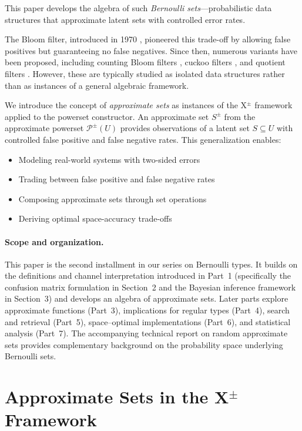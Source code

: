 \documentclass[11pt,final,hidelinks]{article}
\begin{document}
This paper develops the algebra of such \emph{Bernoulli sets}—probabilistic data structures that approximate latent sets with controlled error rates.

The Bloom filter, introduced in 1970 \cite{bloom1970}, pioneered this trade-off by allowing false positives but guaranteeing no false negatives. Since then, numerous variants have been proposed, including counting Bloom filters \cite{fan2000}, cuckoo filters \cite{fan2014}, and quotient filters \cite{bender2012}. However, these are typically studied as isolated data structures rather than as instances of a general algebraic framework.

We introduce the concept of \emph{approximate sets} as instances of the X$^{\pm}$ framework applied to the powerset constructor. An approximate set $S^{\pm}$ from the approximate powerset $\mathcal{P}^{\pm}(U)$ provides observations of a latent set $S \subseteq U$ with controlled false positive and false negative rates. This generalization enables:

\begin{itemize}
    \item Modeling real-world systems with two-sided errors
    \item Trading between false positive and false negative rates
    \item Composing approximate sets through set operations
    \item Deriving optimal space-accuracy trade-offs
\end{itemize}

\paragraph{Scope and organization.}  This paper is the second installment in our series on Bernoulli types.  It builds on the definitions and channel interpretation introduced in Part~1 (specifically the confusion matrix formulation in Section~2 and the Bayesian inference framework in Section~3) and develops an algebra of approximate sets.  Later parts explore approximate functions (Part~3), implications for regular types (Part~4), search and retrieval (Part~5), space–optimal implementations (Part~6), and statistical analysis (Part~7).  The accompanying technical report on random approximate sets provides complementary background on the probability space underlying Bernoulli sets.

\section{Approximate Sets in the X$^{\pm}$ Framework}
\end{document}
